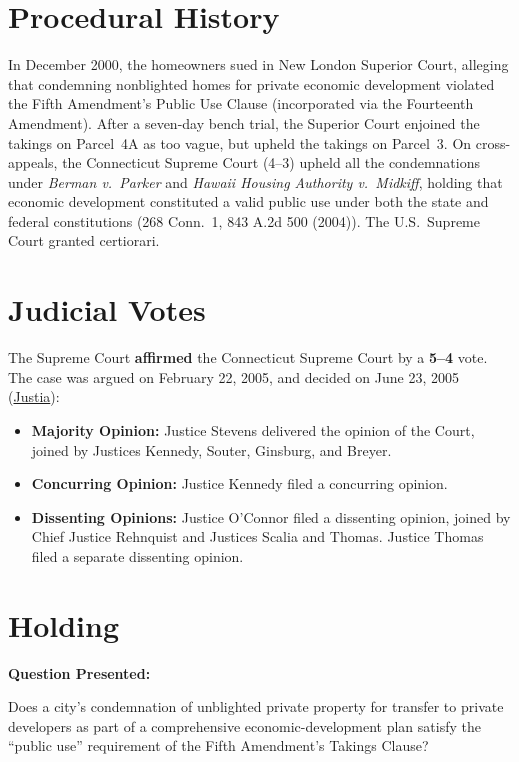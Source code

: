 \documentclass[12pt]{article}
\begin{document}
\section{Procedural History}
In December 2000, the homeowners sued in New London Superior Court, alleging that condemning nonblighted homes for private economic development violated the Fifth Amendment's Public Use Clause (incorporated via the Fourteenth Amendment). After a seven-day bench trial, the Superior Court enjoined the takings on Parcel~4A as too vague, but upheld the takings on Parcel~3. On cross-appeals, the Connecticut Supreme Court (4--3) upheld all the condemnations under \textit{Berman v.\ Parker} and \textit{Hawaii Housing Authority v.\ Midkiff}, holding that economic development constituted a valid public use under both the state and federal constitutions (268 Conn.\ 1, 843 A.2d 500 (2004)). The U.S.\ Supreme Court granted certiorari.

\section{Judicial Votes}
The Supreme Court \textbf{affirmed} the Connecticut Supreme Court by a \textbf{5--4} vote. The case was argued on February 22, 2005, and decided on June 23, 2005 (\href{https://supreme.justia.com/cases/federal/us/545/469/}{Justia}):

\begin{itemize}
    \item \textbf{Majority Opinion:} Justice Stevens delivered the opinion of the Court, joined by Justices Kennedy, Souter, Ginsburg, and Breyer.
    \item \textbf{Concurring Opinion:} Justice Kennedy filed a concurring opinion.
    \item \textbf{Dissenting Opinions:} Justice O'Connor filed a dissenting opinion, joined by Chief Justice Rehnquist and Justices Scalia and Thomas. Justice Thomas filed a separate dissenting opinion.
\end{itemize}

\section{Holding}
\textbf{Question Presented:}

Does a city's condemnation of unblighted private property for transfer to private developers as part of a comprehensive economic-development plan satisfy the ``public use'' requirement of the Fifth Amendment's Takings Clause?
\end{document}
